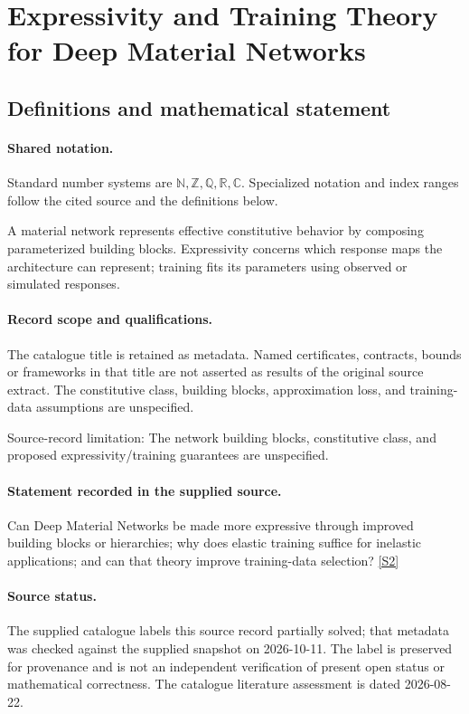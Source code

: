 \documentclass[11pt]{article}
\newcommand{\sref}[2]{\hyperlink{source:#1:#2}{[S#2]}}
\begin{document}
\section{Expressivity and Training Theory for Deep Material Networks}\label{statement}

\subsection{Definitions and mathematical statement}

\paragraph{Shared notation.}Standard number systems are $\mathbb N,\mathbb Z,\mathbb Q,\mathbb R,\mathbb C$. Specialized notation and index ranges follow the cited source and the definitions below.


A material network represents effective constitutive behavior by composing parameterized building blocks. Expressivity concerns which response maps the architecture can represent; training fits its parameters using observed or simulated responses.
\paragraph{Record scope and qualifications.}
The catalogue title is retained as metadata. Named certificates, contracts, bounds or frameworks in that title are not asserted as results of the original source extract.
The constitutive class, building blocks, approximation loss, and training-data assumptions are unspecified.

Source-record limitation: The network building blocks, constitutive class, and proposed expressivity/training guarantees are unspecified.
\paragraph{Statement recorded in the supplied source.}
Can Deep Material Networks be made more expressive through improved building blocks or hierarchies; why does elastic training suffice for inelastic applications; and can that theory improve training-data selection? \sref{statement}{2}
\paragraph{Source status.}
The supplied catalogue labels this source record partially solved; that metadata was checked against the supplied snapshot on 2026-10-11. The label is preserved for provenance and is not an independent verification of present open status or mathematical correctness. The catalogue literature assessment is dated 2026-08-22.
\end{document}
